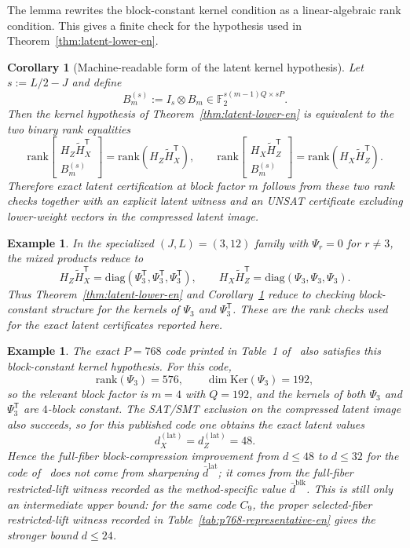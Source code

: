 \documentclass[11pt]{article}
\newcommand{\Ftwo}{\mathbb{F}_2}
\newcommand{\Ker}{\mathrm{Ker}}
\newcommand{\rank}{\mathrm{rank}}
\newcommand{\diag}{\mathrm{diag}}
\newcommand{\Htil}{\tilde{H}}
\newcommand{\dbound}[1]{\ensuremath{\bar{d}^{\mathrm{#1}}}}
\newcommand{\dlat}{\dbound{lat}}
\newcommand{\dblk}{\dbound{blk}}
\theoremstyle{uprightthm}
\newtheorem{corollary}[theorem]{Corollary}
\newtheorem{example}[theorem]{Example}
\begin{document}
The lemma rewrites the block-constant kernel condition as a linear-algebraic
rank condition.  This gives a finite check for the hypothesis used in
Theorem~\ref{thm:latent-lower-en}.

\begin{corollary}[Machine-readable form of the latent kernel hypothesis]
\label{cor:kernel-rank-test-en}
Let $s:=L/2-J$ and define
\[
B_m^{(s)}:=I_s\otimes B_m\in\Ftwo^{s(m-1)Q\times sP}.
\]
Then the kernel hypothesis of Theorem~\ref{thm:latent-lower-en} is equivalent to the two binary rank equalities
\[
\rank\!\begin{bmatrix}H_Z\Htil_X^{\mathsf T}\\ B_m^{(s)}\end{bmatrix}
=\rank(H_Z\Htil_X^{\mathsf T}),
\qquad
\rank\!\begin{bmatrix}H_X\Htil_Z^{\mathsf T}\\ B_m^{(s)}\end{bmatrix}
=\rank(H_X\Htil_Z^{\mathsf T}).
\]
Therefore exact latent certification at block factor $m$ follows from these two
rank checks together with an explicit latent witness and an UNSAT certificate
excluding lower-weight vectors in the compressed latent image.
\end{corollary}

\begin{example}
In the specialized $(J,L)=(3,12)$ family with $\Psi_r=0$ for $r\neq 3$, the mixed products reduce to
\[
H_Z\Htil_X^{\mathsf T}=\diag(\Psi_3^{\mathsf T},\Psi_3^{\mathsf T},\Psi_3^{\mathsf T}),
\qquad
H_X\Htil_Z^{\mathsf T}=\diag(\Psi_3,\Psi_3,\Psi_3).
\]
Thus Theorem~\ref{thm:latent-lower-en} and Corollary~\ref{cor:kernel-rank-test-en}
reduce to checking block-constant structure for the kernels of $\Psi_3$ and
$\Psi_3^{\mathsf T}$.  These are the rank checks used for the exact latent
certificates reported here.
\end{example}

\begin{example}
The exact $P=768$ code printed in Table~1 of~\cite{Kasai2026} also satisfies this block-constant kernel hypothesis. For this code,
\[
\rank(\Psi_3)=576,\qquad \dim\Ker(\Psi_3)=192,
\]
so the relevant block factor is $m=4$ with $Q=192$, and the kernels of both $\Psi_3$ and $\Psi_3^{\mathsf T}$ are $4$-block constant.
The SAT/SMT exclusion on the compressed latent image also succeeds, so for this published code one obtains the exact latent values
\[
d_X^{(\mathrm{lat})}=d_Z^{(\mathrm{lat})}=48.
\]
Hence the full-fiber block-compression improvement from $d\le 48$ to
$d\le 32$ for the code of~\cite{Kasai2026} does not come from sharpening
\dlat; it comes from the full-fiber restricted-lift witness recorded as the
method-specific value \dblk.  This is still only an intermediate upper bound:
for the same code \(C_9\), the proper selected-fiber restricted-lift witness
recorded in Table~\ref{tab:p768-representative-en} gives the stronger bound
\(d\le 24\).
\end{example}
\end{document}
